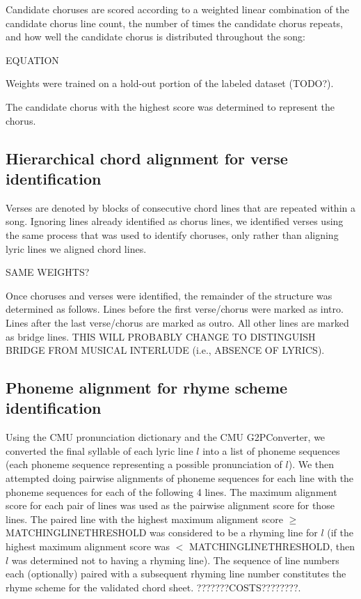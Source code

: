 \documentclass[12pt]{article}
\begin{document}
Candidate choruses are scored according to a weighted linear combination of the candidate chorus line count, the number of times the candidate chorus repeats, and how well the candidate chorus is distributed throughout the song:

EQUATION

Weights were trained on a hold-out portion of the labeled dataset (TODO?).

The candidate chorus with the highest score was determined to represent the chorus.

\subsection{Hierarchical chord alignment for verse identification}

Verses are denoted by blocks of consecutive chord lines that are repeated within a song. Ignoring lines already identified as chorus lines, we identified verses using the same process that was used to identify choruses, only rather than aligning lyric lines we aligned chord lines. 

SAME WEIGHTS? 

Once choruses and verses were identified, the remainder of the structure was determined as follows. Lines before the first verse/chorus were marked as intro. Lines after the last verse/chorus are marked as outro. All other lines are marked as bridge lines. THIS WILL PROBABLY CHANGE TO DISTINGUISH BRIDGE FROM MUSICAL INTERLUDE (i.e., ABSENCE OF LYRICS).

\subsection{Phoneme alignment for rhyme scheme identification}

Using the CMU pronunciation dictionary and the CMU G2PConverter, we converted the final syllable of each lyric line $l$ into a list of phoneme sequences (each phoneme sequence representing a possible pronunciation of $l$). We then attempted doing pairwise alignments of phoneme sequences for each line with the phoneme sequences for each of the following 4 lines. The maximum alignment score for each pair of lines was used as the pairwise alignment score for those lines. The paired line with the highest maximum alignment score $\ge$ MATCHINGLINETHRESHOLD was considered to be a rhyming line for $l$ (if the highest maximum alignment score was $<$ MATCHINGLINETHRESHOLD, then $l$ was determined not to having a rhyming line). The sequence of line numbers each (optionally) paired with a subsequent rhyming line number constitutes the rhyme scheme for the validated chord sheet. ???????COSTS????????.
\end{document}
